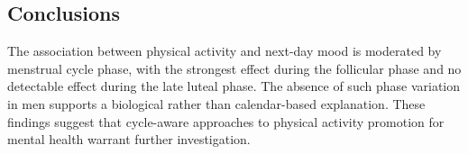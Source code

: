 \documentclass[12pt]{article}
\begin{document}

\subsection*{Conclusions}

The association between physical activity and next-day mood is moderated by menstrual cycle phase, with the strongest effect during the follicular phase and no detectable effect during the late luteal phase. The absence of such phase variation in men supports a biological rather than calendar-based explanation. These findings suggest that cycle-aware approaches to physical activity promotion for mental health warrant further investigation.
\end{document}
